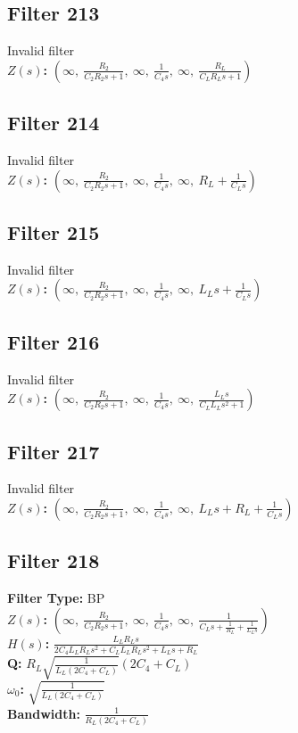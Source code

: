 \documentclass{article}
\begin{document}
\subsection*{Filter 213}
Invalid filter \\ 
\textbf{$Z(s)$:} $\left( \infty, \  \frac{R_{2}}{C_{2} R_{2} s + 1}, \  \infty, \  \frac{1}{C_{4} s}, \  \infty, \  \frac{R_{L}}{C_{L} R_{L} s + 1}\right)$ \\ 
\subsection*{Filter 214}
Invalid filter \\ 
\textbf{$Z(s)$:} $\left( \infty, \  \frac{R_{2}}{C_{2} R_{2} s + 1}, \  \infty, \  \frac{1}{C_{4} s}, \  \infty, \  R_{L} + \frac{1}{C_{L} s}\right)$ \\ 
\subsection*{Filter 215}
Invalid filter \\ 
\textbf{$Z(s)$:} $\left( \infty, \  \frac{R_{2}}{C_{2} R_{2} s + 1}, \  \infty, \  \frac{1}{C_{4} s}, \  \infty, \  L_{L} s + \frac{1}{C_{L} s}\right)$ \\ 
\subsection*{Filter 216}
Invalid filter \\ 
\textbf{$Z(s)$:} $\left( \infty, \  \frac{R_{2}}{C_{2} R_{2} s + 1}, \  \infty, \  \frac{1}{C_{4} s}, \  \infty, \  \frac{L_{L} s}{C_{L} L_{L} s^{2} + 1}\right)$ \\ 
\subsection*{Filter 217}
Invalid filter \\ 
\textbf{$Z(s)$:} $\left( \infty, \  \frac{R_{2}}{C_{2} R_{2} s + 1}, \  \infty, \  \frac{1}{C_{4} s}, \  \infty, \  L_{L} s + R_{L} + \frac{1}{C_{L} s}\right)$ \\ 
\subsection*{Filter 218}
\textbf{Filter Type:} BP \\ 
\textbf{$Z(s)$:} $\left( \infty, \  \frac{R_{2}}{C_{2} R_{2} s + 1}, \  \infty, \  \frac{1}{C_{4} s}, \  \infty, \  \frac{1}{C_{L} s + \frac{1}{R_{L}} + \frac{1}{L_{L} s}}\right)$ \\ 
\textbf{$H(s)$:} $\frac{L_{L} R_{L} s}{2 C_{4} L_{L} R_{L} s^{2} + C_{L} L_{L} R_{L} s^{2} + L_{L} s + R_{L}}$ \\ 
\textbf{Q:} $R_{L} \sqrt{\frac{1}{L_{L} \left(2 C_{4} + C_{L}\right)}} \left(2 C_{4} + C_{L}\right)$ \\ 
\textbf{$\omega_0$:} $\sqrt{\frac{1}{L_{L} \left(2 C_{4} + C_{L}\right)}}$ \\ 
\textbf{Bandwidth:} $\frac{1}{R_{L} \left(2 C_{4} + C_{L}\right)}$ \\ 
\end{document}
